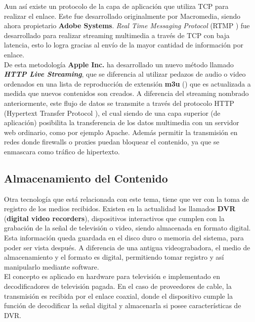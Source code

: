 Aun así existe un protocolo de la capa de aplicación que utiliza TCP para realizar el enlace. Este fue desarrollado originalmente por Macromedia, siendo ahora propietario \textbf{Adobe Systems}. \textit{Real Time Messaging Protocol} (RTMP \cite{bib:rtmp-specs}) fue desarrollado para realizar streaming multimedia a través de TCP con baja latencia, esto lo logra gracias al envío de la mayor cantidad de información por enlace. \\
	
	De esta metodología \textbf{Apple Inc.} ha desarrollado un nuevo método llamado \textit{\textbf{HTTP Live Streaming}}, que se diferencia al utilizar pedazos de audio o video  ordenados en una lista de reproducción de extensión \textbf{m3u} (\cite{sota:m3u-specs}) que es actualizada a medida que nuevos contenidos son creados. A diferencia del streaming nombrado anteriormente, este flujo de datos se transmite a través del protocolo HTTP (Hypertext Transfer Protocol \cite{sota:rfc-http}), el cual siendo de una capa superior (de aplicación) posibilita la transferencia de los datos multimedia con un servidor web ordinario, como por ejemplo Apache. Además permitir la transmisión en redes donde firewalls o proxies puedan bloquear el contenido, ya que se enmascara como tráfico de hipertexto.


\subsection{Almacenamiento del Contenido}

Otra tecnología que está relacionada con este tema, tiene que ver con la toma de registro de los medios recibidos. Existen en la actualidad los llamados \textbf{DVR} (\textbf{digital video recorders}), dispositivos interactivos que cumplen con la grabación de la señal de televisión o video, siendo almacenada en formato digital.\\

 Esta información queda guardada en el disco duro o memoria del sistema, para poder ser vista después. A diferencia de una antigua videograbadora, el medio de almacenamiento y el formato es digital, permitiendo tomar registro y así manipularlo mediante software.\\
 
	El concepto es aplicado en hardware para televisión e implementado en decodificadores de televisión pagada. En el caso de proveedores de cable, la transmisión es recibida por el enlace coaxial, donde el dispositivo cumple la función de decodificar la señal digital y almacenarla si posee características de DVR.

